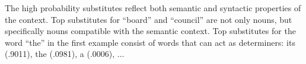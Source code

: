 The high probability substitutes reflect both semantic and syntactic
properties of the context.  Top substitutes for ``board'' and
``council'' are not only nouns, but specifically nouns compatible with
the semantic context.  Top substitutes for the word ``the'' in the
first example consist of words that can act as determiners: its
(.9011), the (.0981), a (.0006), $\ldots$






